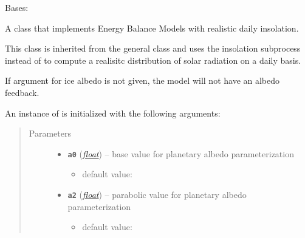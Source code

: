 \documentclass[letterpaper,10pt,english]{sphinxmanual}
\begin{document}
\begin{fulllineitems}
\label{api/climlab.model:climlab.model.ebm.EBM_seasonal}
Bases: {\hyperref[api/climlab.model:climlab.model.ebm.EBM]{\emph{}}}

A class that implements Energy Balance Models with realistic 
daily insolation.

This class is inherited from the general {\hyperref[api/climlab.model:climlab.model.ebm.EBM]{\emph{}}}
class and uses the insolation subprocess 
{\hyperref[api/climlab.radiation:climlab.radiation.insolation.DailyInsolation]{\emph{}}} instead of 
{\hyperref[api/climlab.radiation:climlab.radiation.insolation.P2Insolation]{\emph{}}} to compute a
realisitc distribution of solar radiation on a daily basis.

If argument for ice albedo  is not given, the model will not 
have an albedo feedback.

An instance of  is initialized with the following 
arguments:
\begin{quote}\begin{description}
\item[{Parameters}] \leavevmode\begin{itemize}
\item {} 
\textbf{\texttt{a0}} (\href{http://docs.python.org/2.7/library/functions.html\#float}{\emph{float}}) -- 
base value for planetary albedo parameterization
{\hyperref[api/climlab.surface:climlab.surface.albedo.StepFunctionAlbedo]{\emph{}}}
\begin{itemize}
\item {} 
default value: 

\end{itemize}


\item {} 
\textbf{\texttt{a2}} (\href{http://docs.python.org/2.7/library/functions.html\#float}{\emph{float}}) -- 
parabolic value for planetary  albedo parameterization
{\hyperref[api/climlab.surface:climlab.surface.albedo.StepFunctionAlbedo]{\emph{}}}
\begin{itemize}
\item {} 
default value: 

\end{itemize}



\end{itemize}
\end{description}
\end{quote}
\end{fulllineitems}
\end{document}
